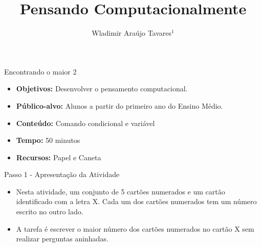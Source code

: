 \documentclass{beamer}
\title {Pensando Computacionalmente}
\author[Wladimir Araújo Tavares]{ Wladimir Araújo Tavares$^{1}$  }
\institute[UFC]{$^{1}$Universidade Federal do Ceará - Campus de Quixadá\\}
\date{}
\begin{document}
\begin{frame}
	\titlepage
\end{frame}




\begin{frame}{Encontrando o maior 2}

\begin{itemize}
\item \textbf{Objetivos:} Desenvolver o pensamento computacional.

\item \textbf{Público-alvo:}  Alunos a partir do primeiro ano do Ensino Médio.

\item \textbf{Conteúdo:} Comando condicional e variável

\item \textbf{Tempo:} 50 minutos

\item \textbf{Recursos:} Papel e Caneta

\end{itemize}
    
\end{frame}


\begin{frame}{Passo 1 - Apresentação da Atividade}

\begin{itemize}
   
\item <1->Nesta atividade, um conjunto de 5 cartões numerados e um cartão identificado com a letra X. Cada um dos cartões numerados tem  um número escrito no outro lado. 

\begin{center}
\end{center}


\item <2->A tarefa é escrever o maior número dos cartões numerados no cartão X sem realizar perguntas aninhadas.

\end{itemize}

\end{frame}
\end{document}
